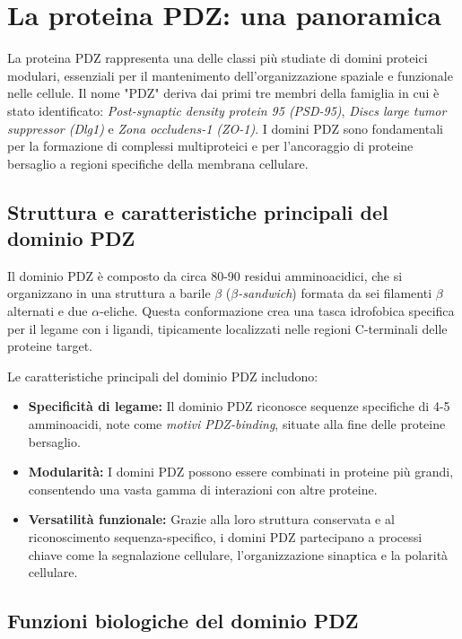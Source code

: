 \documentclass[Lau,binding=0.6cm,oneside,noexaminfo]{sapthesis}
\begin{document}
\section*{La proteina PDZ: una panoramica}

La proteina PDZ rappresenta una delle classi più studiate di domini proteici modulari, essenziali per il mantenimento dell’organizzazione spaziale e funzionale nelle cellule. Il nome "PDZ" deriva dai primi tre membri della famiglia in cui è stato identificato: \emph{Post-synaptic density protein 95 (PSD-95)}, \emph{Discs large tumor suppressor (Dlg1)} e \emph{Zona occludens-1 (ZO-1)}. I domini PDZ sono fondamentali per la formazione di complessi multiproteici e per l’ancoraggio di proteine bersaglio a regioni specifiche della membrana cellulare.

\subsection*{Struttura e caratteristiche principali del dominio PDZ}

Il dominio PDZ è composto da circa 80-90 residui amminoacidici, che si organizzano in una struttura a barile $\beta$ (\emph{$\beta$-sandwich}) formata da sei filamenti $\beta$ alternati e due $\alpha$-eliche. Questa conformazione crea una tasca idrofobica specifica per il legame con i ligandi, tipicamente localizzati nelle regioni C-terminali delle proteine target.

Le caratteristiche principali del dominio PDZ includono:
\begin{itemize}
    \item \textbf{Specificità di legame:} Il dominio PDZ riconosce sequenze specifiche di 4-5 amminoacidi, note come \emph{motivi PDZ-binding}, situate alla fine delle proteine bersaglio.
    \item \textbf{Modularità:} I domini PDZ possono essere combinati in proteine più grandi, consentendo una vasta gamma di interazioni con altre proteine.
    \item \textbf{Versatilità funzionale:} Grazie alla loro struttura conservata e al riconoscimento sequenza-specifico, i domini PDZ partecipano a processi chiave come la segnalazione cellulare, l’organizzazione sinaptica e la polarità cellulare.
\end{itemize}

\subsection*{Funzioni biologiche del dominio PDZ}
\end{document}
